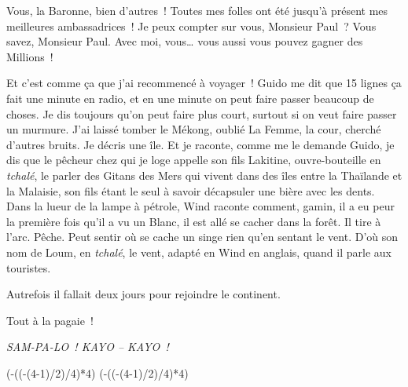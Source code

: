 \documentclass[french,twoside]{book} %
\def\truncdiv#1#2{((#1-(#2-1)/2)/#2)}
\def\moduloop#1#2{(#1-\truncdiv{#1}{#2}*#2)}
\def\modulo#1#2{\number\numexpr\moduloop{#1}{#2}\relax}
\begin{document}
Vous, la Baronne, bien d’autres ! Toutes mes folles ont été jusqu’à présent mes meilleures ambassadrices ! Je peux compter sur vous, Monsieur Paul ? Vous savez, Monsieur Paul. Avec moi, vous… vous aussi vous pouvez gagner des Millions !\par
\bigbreak
\noindent Et c’est comme ça que j’ai recommencé à voyager ! Guido me dit que 15 lignes ça fait une minute en radio, et en une minute on peut faire passer beaucoup de choses. Je dis toujours qu’on peut faire plus court, surtout si on veut faire passer un murmure. J’ai laissé tomber le Mékong, oublié La Femme, la cour, cherché d’autres bruits. Je décris une île. Et je raconte, comme me le demande Guido, je dis que le pêcheur chez qui je loge appelle son fils Lakitine, ouvre-bouteille en\emph{ tchalé}, le parler des Gitans des Mers qui vivent dans des îles entre la Thaïlande et la Malaisie, son fils étant le seul à savoir décapsuler une bière avec les dents. Dans la lueur de la lampe à pétrole, Wind raconte comment, gamin, il a eu peur la première fois qu’il a vu un Blanc, il est allé se cacher dans la forêt. Il tire à l’arc. Pêche. Peut sentir où se cache un singe rien qu’en sentant le vent. D’où son nom de Loum, en \emph{tchalé}, le vent, adapté en Wind en anglais, quand il parle aux touristes.\par
Autrefois il fallait deux jours pour rejoindre le continent.\par
Tout à la pagaie !\par
\bigbreak

\begin{center}
{\itshape SAM-PA-LO ! KAYO – KAYO !}\par
\end{center}


\begin{center}
\par
\end{center}


\begin{center}
\end{center}

 


\ifbooklet
  \pagestyle{empty}
  \clearpage
  \ifnum\modulo{\value{page}}{4}=0 \hbox{}\newpage\hbox{}\newpage\fi
  \ifnum\modulo{\value{page}}{4}=1 \hbox{}\newpage\hbox{}\newpage\fi
\end{document}
